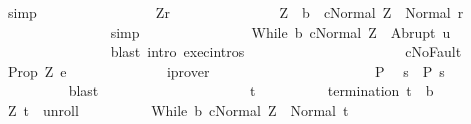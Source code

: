 \begin{isabellebody}
\ simp\isanewline
\ \ \ \ \ \ \ \ \ \ \ \ \isamarkupfalse%
\ \isamarkupfalse%
\ \ Z{\isacharunderscore}r\ \isamarkupfalse%
\isanewline
\ \ \ \ \ \ \ \ \ \ \ \ \ \ {\isachardoublequoteopen}Z\ {\isasymin}\ b{\isachardoublequoteclose}\ \ {\isachardoublequoteopen}{\isasymGamma}{\isasymturnstile}{\isasymlangle}c{\isacharcomma}Normal\ Z{\isasymrangle}\ {\isasymRightarrow}\ Normal\ r{\isachardoublequoteclose}\isanewline
\ \ \ \ \ \ \ \ \ \ \ \ \ \ \isamarkupfalse%
\ simp\isanewline
\ \ \ \ \ \ \ \ \ \ \ \ \isamarkupfalse%
\ \isamarkupfalse%
\ {\isachardoublequoteopen}{\isasymGamma}{\isasymturnstile}{\isasymlangle}While\ b\ c{\isacharcomma}Normal\ Z{\isasymrangle}\ {\isasymRightarrow}\ Abrupt\ u{\isachardoublequoteclose}\isanewline
\ \ \ \ \ \ \ \ \ \ \ \ \ \ \isamarkupfalse%
\ {\isacharparenleft}blast\ intro{\isacharcolon}\ exec{\isachardot}intros{\isacharparenright}\isanewline
\ \ \ \ \ \ \ \ \ \ \isacommand{{\isacharbraceright}}\isamarkupfalse%
\isanewline
\ \ \ \ \ \ \ \ \ \ \isamarkupfalse%
\ cNoFault\ \isamarkupfalse%
\ {\isachardoublequoteopen}{\isacharquery}Prop\ Z\ e{\isachardoublequoteclose}\isanewline
\ \ \ \ \ \ \ \ \ \ \ \ \isamarkupfalse%
\ iprover\isanewline
\ \ \ \ \ \ \ \ \isamarkupfalse%
\isanewline
\ \ \ \ \ \ \isacommand{{\isacharbraceright}}\isamarkupfalse%
\isanewline
\ \ \ \ \ \ \isamarkupfalse%
\ P\ \isamarkupfalse%
\ {\isachardoublequoteopen}s\ {\isasymin}\ {\isacharquery}P{\isacharprime}\ s{\isachardoublequoteclose}\isanewline
\ \ \ \ \ \ \ \ \isamarkupfalse%
\ blast\isanewline
\ \ \ \ \isamarkupfalse%
\isanewline
\ \ \ \ \ \ \isacommand{{\isacharbraceleft}}\isamarkupfalse%
\isanewline
\ \ \ \ \ \ \ \ \isamarkupfalse%
\ t\isanewline
\ \ \ \ \ \ \ \ \isamarkupfalse%
\ {\isachardoublequoteopen}termination{\isachardoublequoteclose}{\isacharcolon}\ {\isachardoublequoteopen}t\ {\isasymnotin}\ b{\isachardoublequoteclose}\isanewline
\ \ \ \ \ \ \ \ \isamarkupfalse%
\ {\isachardoublequoteopen}{\isacharparenleft}Z{\isacharcomma}\ t{\isacharparenright}\ {\isasymin}\ {\isacharquery}unroll{\isachardoublequoteclose}\isanewline
\ \ \ \ \ \ \ \ \isamarkupfalse%
\ {\isachardoublequoteopen}{\isasymGamma}{\isasymturnstile}{\isasymlangle}While\ b\ c{\isacharcomma}Normal\ Z{\isasymrangle}\ {\isasymRightarrow}\ Normal\ t{\isachardoublequoteclose}\isanewline

\end{isabellebody}
